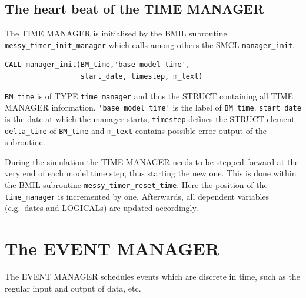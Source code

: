 \documentclass[twoside]{article}
\begin{document}
\subsection{The heart beat of the TIME MANAGER}
%
The TIME MANAGER is initialised by the BMIL subroutine 
\verb|messy_timer_init_manager| which calls among others the SMCL 
\verb|manager_init|. 
\begin{verbatim}
CALL manager_init(BM_time,'base model time', 
                  start_date, timestep, m_text)
\end{verbatim} 
\verb|BM_time| is of {\footnotesize TYPE} \verb|time_manager| and thus the 
 {\footnotesize STRUCT} containing all
TIME MANAGER information. \verb|'base model time'| is the label of
 \verb|BM_time|.
\verb|start_date| is the date at which the manager starts, \verb|timestep| 
defines the  {\footnotesize STRUCT} element \verb|delta_time| of \verb|BM_time|
 and \verb|m_text| contains possible error output of the subroutine.

During the simulation the TIME MANAGER needs to be stepped forward at the 
very end of each model time 
step, thus starting the new one. This is done within the BMIL subroutine 
\verb|messy_timer_reset_time|. Here the position of the \verb|time_manager| is 
incremented by one. Afterwards, all dependent variables (e.g.\ dates and 
{\footnotesize LOGICAL}s) are updated accordingly.

\section{The EVENT MANAGER}
The EVENT MANAGER schedules events which are discrete in time, such
as the regular input and output of data, etc.

\end{document}
